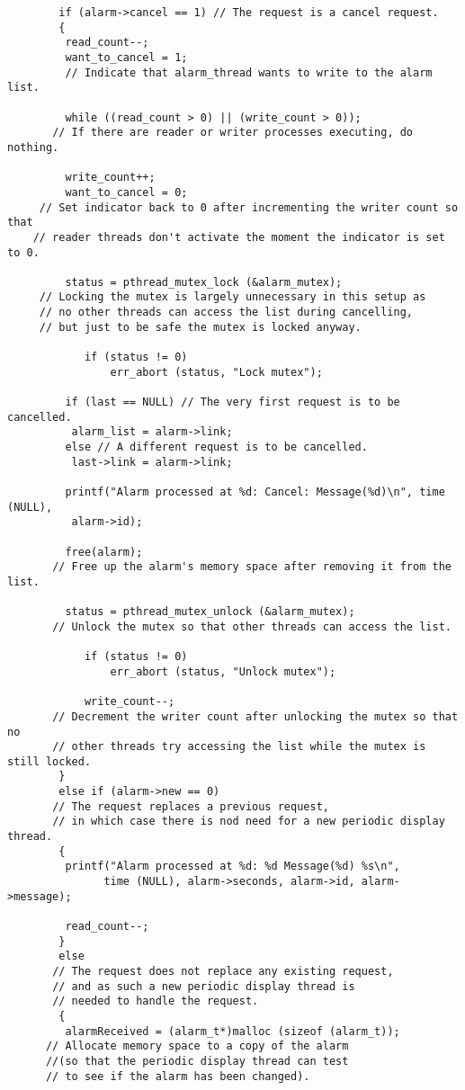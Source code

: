 \documentclass[11pt]{article}
\begin{document}
\begin{lstlisting}
        if (alarm->cancel == 1) // The request is a cancel request.
        {
         read_count--;
         want_to_cancel = 1; 
         // Indicate that alarm_thread wants to write to the alarm list.
         
         while ((read_count > 0) || (write_count > 0)); 
       // If there are reader or writer processes executing, do nothing.
         
         write_count++;
         want_to_cancel = 0; 
     // Set indicator back to 0 after incrementing the writer count so that 
    // reader threads don't activate the moment the indicator is set to 0.
         
         status = pthread_mutex_lock (&alarm_mutex); 
     // Locking the mutex is largely unnecessary in this setup as 
     // no other threads can access the list during cancelling, 
     // but just to be safe the mutex is locked anyway.
            
            if (status != 0)
                err_abort (status, "Lock mutex");
            
         if (last == NULL) // The very first request is to be cancelled.
          alarm_list = alarm->link;
         else // A different request is to be cancelled.
          last->link = alarm->link;
         
         printf("Alarm processed at %d: Cancel: Message(%d)\n", time (NULL),
          alarm->id);
         
         free(alarm); 
       // Free up the alarm's memory space after removing it from the list.
         
         status = pthread_mutex_unlock (&alarm_mutex); 
       // Unlock the mutex so that other threads can access the list.
      
            if (status != 0)
                err_abort (status, "Unlock mutex");
                
            write_count--; 
       // Decrement the writer count after unlocking the mutex so that no
       // other threads try accessing the list while the mutex is still locked.
        }
        else if (alarm->new == 0) 
       // The request replaces a previous request, 
       // in which case there is nod need for a new periodic display thread.
        {
         printf("Alarm processed at %d: %d Message(%d) %s\n",
               time (NULL), alarm->seconds, alarm->id, alarm->message);
               
         read_count--;
        }
        else 
       // The request does not replace any existing request, 
       // and as such a new periodic display thread is 
       // needed to handle the request.
        {
         alarmReceived = (alarm_t*)malloc (sizeof (alarm_t)); 
      // Allocate memory space to a copy of the alarm 
      //(so that the periodic display thread can test 
      // to see if the alarm has been changed).
 

\end{lstlisting}
\end{document}

